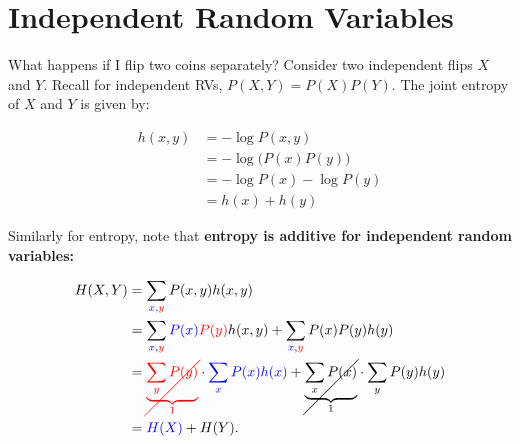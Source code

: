 \section{Independent Random Variables}

What happens if I flip two coins separately? Consider two independent flips $X$ and $Y$. Recall for independent RVs, $P(X, Y) = P(X)P(Y)$. The joint entropy of $X$ and $Y$ is given by:

\begin{align*}
    h(x, y) & = -\log P(x, y)             \\
            & = -\log \big(P(x) P(y)\big) \\
            & = -\log P(x) - \log P(y)    \\
            & = h(x) + h(y)
\end{align*}

Similarly for entropy, note that \textbf{entropy is additive for independent random variables:}


\begin{align*}
    H(X, Y) & = \sum_{\textcolor{blue}{x}, \textcolor{red}{y}} P(x, y) h(x, y)                                                                                                      \\
            & = \sum_{\textcolor{blue}{x}, \textcolor{red}{y}} \textcolor{blue}{P(x)} \textcolor{red}{P(y)} h(x, y) + \sum_{\textcolor{blue}{x}, \textcolor{red}{y}} P(x) P(y) h(y) \\
            & = \textcolor{red}{\cancel{\underbrace{\sum_{y} \textcolor{red}{P(y)}}_{\textcolor{red}{1}}}}
    \cdot \textcolor{blue}{\sum_{x} \textcolor{blue}{P(x)} h(x)}
    + \cancel{\underbrace{\sum_{x} P(x)}_{1}} \cdot \sum_{y} P(y) h(y)                                                                                                              \\
            & = \textcolor{blue}{H(X)} + H(Y).
\end{align*}


